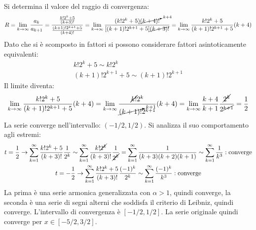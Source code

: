 \documentclass{article}
\numberwithin{equation}{subsection}
\begin{document}
Si determina il valore del raggio di convergenza:
\begin{gather*}
    R=\displaystyle\lim_{k\to\infty}\frac{a_k}{a_{k+1}}=\frac{\frac{k!2^k+5}{(k+3)!}}{\frac{(k+1)!2^{k+1}+5}{(k+4)!}}=
    \lim_{k\to\infty}\frac{(k!2^k+5)\cancelto{k+4}{(k+4)!}}{[(k+1)!2^{k+1}+5]\cancel{(k+3)!}}=
    \lim_{k\to\infty}\frac{k!2^k+5}{(k+1)!2^{k+1}+5}(k+4)
\end{gather*}
Dato che si è scomposto in fattori si possono considerare fattori asintoticamente equivalenti:
\begin{gather*}
    k!2^k+5\sim k!2^k\\
    (k+1)!2^{k+1}+5\sim(k+1)!2^{k+1}
\end{gather*}
Il limite diventa:
\begin{gather*}
    \lim_{k\to\infty}\frac{k!2^k+5}{(k+1)!2^{k+1}+5}(k+4)=
    \lim_{k\to\infty}\frac{\cancel{k!}2^k}{\cancelto{k+1}{(k+1)!}2^{k+1}}(k+4)=
    \lim_{k\to\infty}\frac{k+4}{k+1}\frac{\cancel{2^k}}{2^{\cancel{k+1}}}=\frac{1}{2}    
\end{gather*}
La serie converge nell'intervallo: $(-1/2, 1/2)$. Si analizza il suo comportamento agli estremi:
\begin{gather*}
    \displaystyle t=\frac{1}{2}\rightarrow\displaystyle\sum_{k=1}^\infty\frac{k!2^k+5}{(k+3)!}\frac{1}{2^k}\sim
    \displaystyle\sum_{k=1}^\infty\frac{k!\cancel{2^k}}{(k+3)!}\frac{1}{\cancel{2^k}}=
    \sum_{k=1}^\infty\frac{1}{(k+3)(k+2)(k+1)}\sim\sum_{k=1}^\infty\frac{1}{k^3}:\text{converge}\\
    \displaystyle t=-\frac{1}{2}\rightarrow\displaystyle\sum_{k=1}^\infty\frac{k!2^k+5}{(k+3)!}\frac{(-1)^k}{2^k}\sim\sum_{k=1}^\infty\frac{(-1)^k}{k^3}:\text{converge}
\end{gather*}
La prima è una serie armonica generalizzata con $\alpha>1$, quindi converge, la seconda è una serie di segni alterni che soddisfa il criterio di Leibniz, quindi converge. L'intervallo di convergenza è $[-1/2, 1/2]$. La serie originale quindi converge per $x\in[-5/2, 3/2]$. 


















\end{document}
